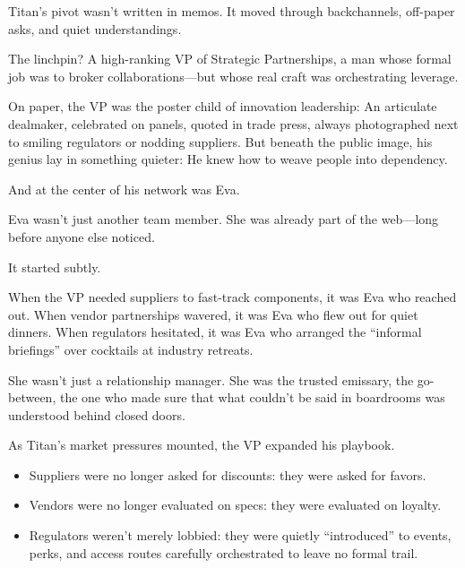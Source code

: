 Titan’s pivot wasn’t written in memos.
It moved through backchannels, off-paper asks, and quiet understandings.

The linchpin?
A high-ranking VP of Strategic Partnerships, a man whose formal job was to broker collaborations—but whose real craft was orchestrating leverage.

On paper, the VP was the poster child of innovation leadership:
An articulate dealmaker, celebrated on panels, quoted in trade press, always photographed next to smiling regulators or nodding suppliers.
But beneath the public image, his genius lay in something quieter:
He knew how to weave people into dependency.

And at the center of his network was Eva.

Eva wasn’t just another team member.
She was already part of the web—long before anyone else noticed.

It started subtly.

When the VP needed suppliers to fast-track components, it was Eva who reached out.
When vendor partnerships wavered, it was Eva who flew out for quiet dinners.
When regulators hesitated, it was Eva who arranged the “informal briefings” over cocktails at industry retreats.

She wasn’t just a relationship manager.
She was the trusted emissary, the go-between, the one who made sure that what couldn’t be said in boardrooms was understood behind closed doors.

As Titan’s market pressures mounted, the VP expanded his playbook.

\begin{itemize}
    \item Suppliers were no longer asked for discounts: they were asked for favors.
    \item Vendors were no longer evaluated on specs: they were evaluated on loyalty.
    \item Regulators weren’t merely lobbied: they were quietly “introduced” to events, perks, and access routes carefully orchestrated to leave no formal trail.
\end{itemize}

\medskip

